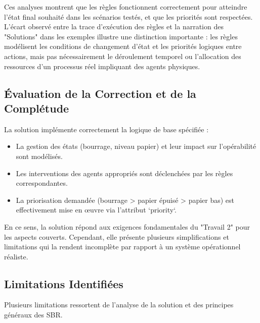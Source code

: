 \documentclass[11pt,a4paper]{article}
\begin{document}
Ces analyses montrent que les règles fonctionnent correctement pour atteindre l'état final souhaité dans les scénarios testés, et que les priorités sont respectées. L'écart observé entre la trace d'exécution des règles et la narration des "Solutions" dans les exemples illustre une distinction importante : les règles modélisent les conditions de changement d'état et les priorités logiques entre actions, mais pas nécessairement le déroulement temporel ou l'allocation des ressources d'un processus réel impliquant des agents physiques.

\subsection{Évaluation de la Correction et de la Complétude}

La solution implémente correctement la logique de base spécifiée :
\begin{itemize}
    \item La gestion des états (bourrage, niveau papier) et leur impact sur l'opérabilité sont modélisés.
    \item Les interventions des agents appropriés sont déclenchées par les règles correspondantes.
    \item La priorisation demandée (bourrage > papier épuisé > papier bas) est effectivement mise en œuvre via l'attribut `priority`.
\end{itemize}
En ce sens, la solution répond aux exigences fondamentales du "Travail 2" pour les aspects couverts. Cependant, elle présente plusieurs simplifications et limitations qui la rendent incomplète par rapport à un système opérationnel réaliste.

\subsection{Limitations Identifiées}

Plusieurs limitations ressortent de l'analyse de la solution et des principes généraux des SBR.

\begin{table}[ht]
\centering
\caption{Analyse de l'exécution des cas de test.}
\label{tab:test_analysis}
\end{table}
\end{document}
